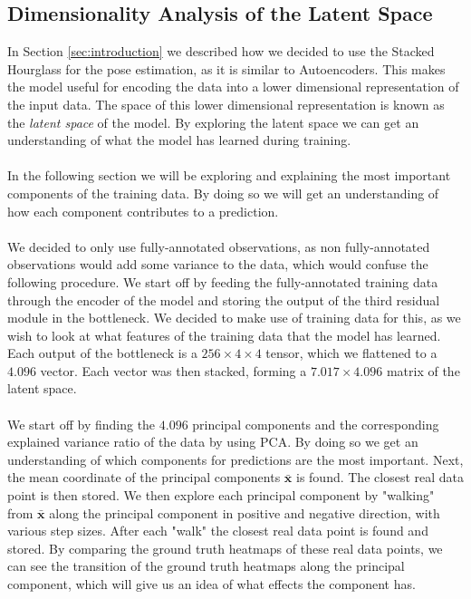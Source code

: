 \documentclass[./main.tex]{subfiles}
\begin{document}
\subsection{Dimensionality Analysis of the Latent Space}\label{subsec:shape_analysis}
In Section \ref{sec:introduction} we described how we decided to use the Stacked Hourglass for the pose estimation, as it is similar to Autoencoders. This makes the model useful for encoding the data into a lower dimensional representation of the input data. The space of this lower dimensional representation is known as the \textit{latent space} of the model. By exploring the latent space we can get an understanding of what the model has learned during training.
\\
\\
In the following section we will be exploring and explaining the most important components of the training data. By doing so we will get an understanding of how each component contributes to a prediction.
\\
\\
We decided to only use fully-annotated observations, as non fully-annotated observations would add some variance to the data, which would confuse the following procedure. We start off by feeding the fully-annotated training data through the encoder of the model and storing the output of the third residual module in the bottleneck. We decided to make use of training data for this, as we wish to look at what features of the training data that the model has learned. Each output of the bottleneck is a $256 \times 4 \times 4$ tensor, which we flattened to a $4.096$ vector. Each vector was then stacked, forming a $7.017 \times 4.096$ matrix of the latent space.
\\
\\
We start off by finding the $4.096$ principal components and the corresponding explained variance ratio of the data by using PCA. By doing so we get an understanding of which components for predictions are the most important. Next, the mean coordinate of the principal components $\bar{\bm{x}}$ is found. The closest real data point is then stored. We then explore each principal component by "walking" from $\bar{\bm{x}}$ along the principal component in positive and negative direction, with various step sizes. After each "walk" the closest real data point is found and stored. By comparing the ground truth heatmaps of these real data points, we can see the transition of the ground truth heatmaps along the principal component, which will give us an idea of what effects the component has.
\end{document}
